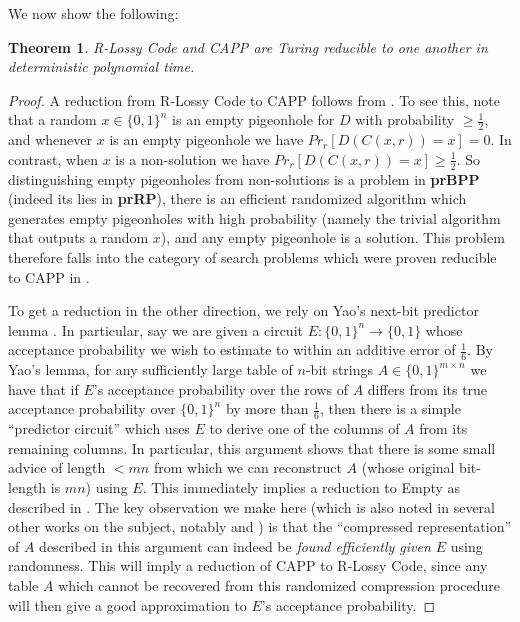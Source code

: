 \documentclass[11pt]{article}
\newtheorem{theorem}{Theorem}
\newcommand{\B}{\{0,1\}}
\def\cl{\bf}
\begin{document}
We now show the following:
\begin{theorem}\label{thm:bpp-pigeon}
{\sc R-Lossy Code} and {\sc CAPP} are Turing reducible to one another in deterministic polynomial time.
\end{theorem}
\begin{proof}
A reduction from {\sc R-Lossy Code} to {\sc CAPP} follows from \cite{Goldreich}. To see this, note that a random $x \in \B^n$ is an empty pigeonhole for $D$ with probability $\geq \frac{1}{2}$, and whenever $x$ is an empty pigeonhole we have $Pr_r[D(C(x,r))=x] = 0$. In contrast, when $x$ is a non-solution we have $Pr_r[D(C(x,r))=x] \geq \frac{1}{2}$. So distinguishing empty pigeonholes from non-solutions is a problem in {\cl prBPP} (indeed its lies in {\cl prRP}), there is an efficient randomized algorithm which generates empty pigeonholes with high probability (namely the trivial algorithm that outputs a random $x$), and any empty pigeonhole is a solution. This problem therefore falls into the category of search problems which were proven reducible to {\sc CAPP} in \cite{Goldreich}.

To get a reduction in the other direction, we rely on Yao's next-bit predictor lemma \cite{Yao}. In particular, say we are given a circuit $E \colon \B^n \to \B$ whose acceptance probability we wish to estimate to within an additive error of $\frac{1}{6}$. By Yao's lemma, for any sufficiently large table of $n$-bit strings $A \in \B^{m \times n}$ we have that if $E$'s acceptance probability over the rows of $A$ differs from its true acceptance probability over $\B^n$ by more than $\frac{1}{6}$, then there is a simple ``predictor circuit'' which uses $E$ to derive one of the columns of $A$ from its remaining columns. In particular, this argument shows that there is some small advice of length $<mn$ from which we can reconstruct $A$ (whose original bit-length is $mn$) using $E$. This immediately implies a reduction to {\sc Empty} as described in \cite{Korten}. The key observation we make here (which is also noted in several other works on the subject, notably \cite{CIKK} and \cite{Hirahara}) is that the ``compressed representation'' of $A$ described in this argument can indeed be \emph{found efficiently given $E$} using randomness. This will imply a reduction of {\sc CAPP} to {\sc R-Lossy Code}, since any table $A$ which cannot be recovered from this randomized compression procedure will then give a good approximation to $E$'s acceptance probability.


\end{proof}
\end{document}
